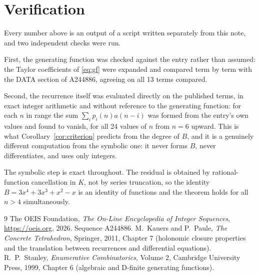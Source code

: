 \documentclass[11pt,a4paper]{article}
\theoremstyle{plain}
\theoremstyle{definition}
\begin{document}
\section{Verification}

Every number above is an output of a script written separately from this note, and two
independent checks were run.

First, the generating function was checked against the entry rather than assumed: the
Taylor coefficients of \eqref{eq:gf} were expanded and compared term by term with the DATA
section of A244886, agreeing on all 13 terms compared.

Second, the recurrence itself was evaluated directly on the published terms, in exact
integer arithmetic and without reference to the generating function: for each $n$ in range
the sum $\sum_{i}p_{i}(n)a(n-i)$ was formed from the entry's own values and found to
vanish, for all 24 values of $n$ from $n=6$ upward. This is what
Corollary~\ref{cor:criterion} predicts from the degree of $B$, and it is a genuinely
different computation from the symbolic one: it never forms $B$, never differentiates, and
uses only integers.

The symbolic step is exact throughout. The residual is obtained by rational-function
cancellation in $K$, not by series truncation, so the identity $B=3 x^{4} + 3 x^{3} + x^{2} - x$ is an
identity of functions and the theorem holds for all $n>4$ simultaneously.

\begin{thebibliography}{9}
 The OEIS Foundation, \emph{The On-Line Encyclopedia of Integer Sequences},
\url{https://oeis.org}, 2026. Sequence A244886.
 M.~Kauers and P.~Paule, \emph{The Concrete Tetrahedron}, Springer, 2011,
Chapter 7 (holonomic closure properties and the translation between recurrences and
differential equations).
 R.~P.~Stanley, \emph{Enumerative Combinatorics}, Volume 2, Cambridge
University Press, 1999, Chapter 6 (algebraic and D-finite generating functions).
\end{thebibliography}
\end{document}

